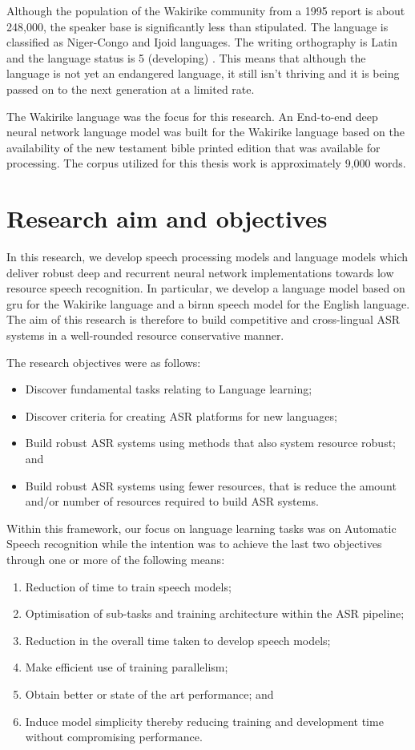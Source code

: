 Although the population of the Wakirike community from a 1995 report \citep{ethnologue} is about 248,000, the speaker base is  significantly less than stipulated.  The language is classified as Niger-Congo and Ijoid languages.  The writing orthography is Latin and the language status is 5 (developing) \citep{ethnologue}.  This means that although the language is not yet an endangered language, it still isn't thriving and it is being passed on to the next generation at a limited rate.

The Wakirike language was the focus for this research.  An End-to-end deep neural network language model was built for the Wakirike language based on the availability of the new testament bible printed edition that was available for processing.  The corpus utilized for this thesis work is approximately 9,000 words.

\section{Research aim and objectives}
In this research, we develop speech processing models and language models which deliver robust deep and recurrent neural network implementations towards low resource speech recognition.  In particular, we develop a language model based on \acrfull{gru} for the Wakirike language and a \acrfull{birnn} speech model for the English language.  The aim of this research is therefore to build competitive and cross-lingual ASR systems in a well-rounded resource conservative manner.

The research objectives were as follows:
\begin{itemize}
    \item Discover fundamental tasks relating to Language learning;
    \item Discover criteria for creating ASR platforms for new languages;
    \item Build robust ASR systems using methods that also system resource robust; and
    \item Build robust ASR systems using fewer resources, that is reduce the amount and/or number of resources required to build ASR systems.
\end{itemize}

Within this framework, our focus on language learning tasks was on Automatic Speech recognition while the intention was to achieve the last two objectives through one or more of the following means:
\begin{enumerate}
    \item Reduction of time to train speech models;
    \item Optimisation of sub-tasks and training architecture within the ASR pipeline;
    \item Reduction in the overall time taken to develop speech models;
    \item Make efficient use of training parallelism;
    \item Obtain better or state of the art performance; and
    \item Induce model simplicity thereby reducing training and development time without compromising performance.
\end{enumerate}

